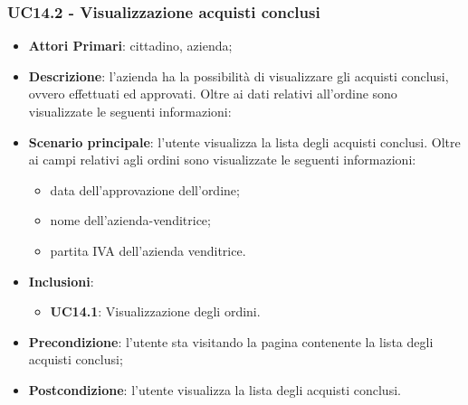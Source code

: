 \subsubsection{UC14.2 - Visualizzazione acquisti conclusi}
\begin{itemize}
	\item \textbf{Attori Primari}: cittadino, azienda;
	\item \textbf{Descrizione}: l'azienda ha la possibilità di visualizzare gli acquisti conclusi, ovvero effettuati ed approvati. Oltre ai dati relativi all'ordine sono visualizzate le seguenti informazioni:
	\item \textbf{Scenario principale}: l'utente visualizza la lista degli acquisti conclusi. Oltre ai campi relativi agli ordini sono visualizzate le seguenti informazioni:
	\begin{itemize}
		\item data dell'approvazione dell'ordine;
		\item nome dell'azienda-venditrice;
		\item partita IVA dell'azienda venditrice.
	\end{itemize}
	
	\item \textbf{Inclusioni}:
	\begin{itemize}
		\item \textbf{UC14.1}: Visualizzazione degli ordini.
	\end{itemize}
	\item \textbf{Precondizione}: l'utente sta visitando la pagina contenente la lista degli acquisti conclusi;
	\item \textbf{Postcondizione}: l'utente visualizza la lista degli acquisti conclusi.
\end{itemize}

